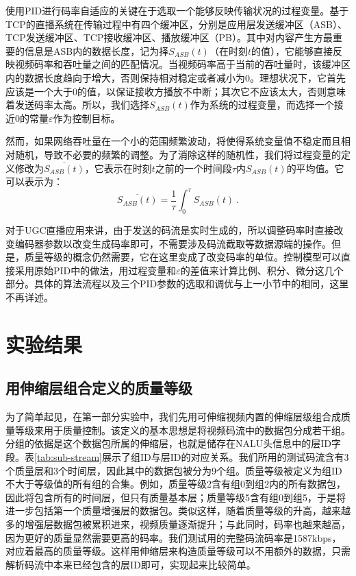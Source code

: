 使用PID进行码率自适应的关键在于选取一个能够反映传输状况的过程变量。基于TCP的直播系统在传输过程中有四个缓冲区，分别是应用层发送缓冲区（ASB）、TCP发送缓冲区、TCP接收缓冲区、播放缓冲区（PB）。其中对内容产生方最重要的信息是ASB内的数据长度，记为择$S_{ASB}(t)$（在时刻$t$的值），它能够直接反映视频码率和吞吐量之间的匹配情况。当视频码率高于当前的吞吐量时，该缓冲区内的数据长度趋向于增大，否则保持相对稳定或者减小为0。理想状况下，它首先应该是一个大于0的值，以保证接收方播放不中断；其次它不应该太大，否则意味着发送码率太高。所以，我们选择$S_{ASB}(t)$作为系统的过程变量，而选择一个接近0的常量$\varepsilon$作为控制目标。

然而，如果网络吞吐量在一个小的范围频繁波动，将使得系统变量值不稳定而且相对随机，导致不必要的频繁的调整。为了消除这样的随机性，我们将过程变量的定义修改为$\overline{S_{ASB}(t)}$，它表示在时刻$t$之前的一个时间段$\tau$内$S_{ASB}(t)$的平均值。它可以表示为：
\begin{equation}
\label{eq:asb}
\overline{S_{ASB}(t)} = \dfrac{1}{\tau} \int_0^\tau {S_{ASB}(t)}\: .
\end{equation}

对于UGC直播应用来讲，由于发送的码流是实时生成的，所以调整码率时直接改变编码器参数以改变生成码率即可，不需要涉及码流截取等数据源端的操作。但是，质量等级的概念仍然需要，它在这里变成了改变码率的单位。控制模型可以直接采用原始PID中的做法，用过程变量和$\varepsilon$的差值来计算比例、积分、微分这几个部分。具体的算法流程以及三个PID参数的选取和调优与上一小节中的相同，这里不再详述。

\section{实验结果}

\subsection{用伸缩层组合定义的质量等级}

为了简单起见，在第一部分实验中，我们先用可伸缩视频内置的伸缩层级组合成质量等级来用于质量控制。该定义的基本思想是将视频码流中的数据包分成若干组。分组的依据是这个数据包所属的伸缩层，也就是储存在NALU头信息中的层ID字段。表\ref{tab:sub-stream}展示了组ID与层ID的对应关系。我们所用的测试码流含有3个质量层和3个时间层，因此其中的数据包被分为9个组。质量等级被定义为组ID不大于等级值的所有组的合集。例如，质量等级2含有组0到组2内的所有数据包，因此将包含所有的时间层，但只有质量基本层；质量等级5含有组0到组5，于是将进一步包括第一个质量增强层的数据包。类似这样，随着质量等级的升高，越来越多的增强层数据包被累积进来，视频质量逐渐提升；与此同时，码率也越来越高，因为更好的质量显然需要更高的码率。我们测试用的完整码流码率是1587kbps，对应着最高的质量等级。这样用伸缩层来构造质量等级可以不用额外的数据，只需解析码流中本来已经包含的层ID即可，实现起来比较简单。

